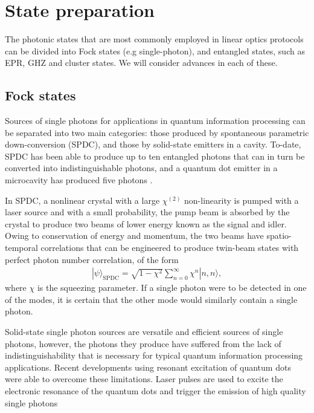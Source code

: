 \documentclass[times,final]{elsarticle}
\newcommand{\ket}[1]{|#1\rangle}
\begin{document}
\section{State preparation}\label{sec:state}

The photonic states that are most commonly employed in linear optics protocols can be divided into Fock states (e.g single-photon), and entangled states, such as EPR, GHZ and cluster states. We will consider advances in each of these.

\subsection{Fock states}\label{sec:singlephotons}

Sources of single photons for applications in quantum information processing can be separated into two main categories: those produced by spontaneous parametric down-conversion (SPDC), and those by solid-state emitters in a cavity. To-date, SPDC has been able to produce up to ten entangled photons \cite{bib:WangChen16,bib:Chen17} that can in turn be converted into indistinguishable photons, and a quantum dot emitter in a microcavity has produced five photons \cite{bib:WangHe16}.

In SPDC, a nonlinear crystal with a large $\chi^{(2)}$ non-linearity is pumped with a laser source and with a small probability, the pump beam is absorbed by the crystal to produce two beams of lower energy known as the signal and idler. Owing to conservation of energy and momentum, the two beams have spatio-temporal correlations that can be engineered to produce twin-beam states with perfect  photon number correlation, of the form
\begin{align}
\ket\psi_\mathrm{SPDC} = \sqrt{1-\chi^2} \sum_{n=0}^\infty \chi^n \ket{n,n},	
\end{align}
where $\chi$ is the squeezing parameter. If a single photon were to be detected in one of the modes, it is certain that the other mode would similarly contain a single photon.


Solid-state single photon sources are versatile and efficient sources of single photons, however, the photons they produce have suffered from the lack of indistinguishability that is necessary for typical quantum information processing applications. Recent developments using resonant excitation of quantum dots were able to overcome these limitations. Laser pulses are used to excite the electronic resonance of the quantum dots and trigger the emission of high quality single photons \cite{bib:WangHe16}
\end{document}
